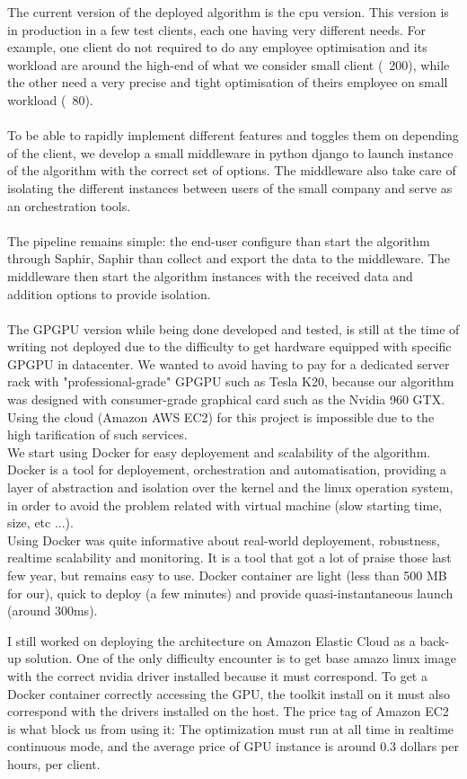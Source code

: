 \documentclass[12pt]{memoir}
\begin{document}
The current version of the deployed algorithm is the cpu version. This version is in
production in a few test clients, each one having very different needs. For example,
one client do not required to do any employee optimisation and its workload are
around the high-end of what we consider small client (~200), while the other need a
very precise and tight optimisation of theirs employee on small workload (~80).\\
\\
To be able to rapidly implement different features and toggles them on depending of the client,
we develop a small middleware in python django to launch instance of the algorithm
with the correct set of options. The middleware also take care of isolating the
different instances between users of the small company and serve as an orchestration
tools.\\
\\
The pipeline remains simple: the end-user configure than start the algorithm through
Saphir, Saphir than collect and export the data to the middleware. The middleware
then start the algorithm instances with the received data and addition options to
provide isolation.\\
\\
The GPGPU version while being done developed and tested, is still at the time of
writing not deployed due to the difficulty to get hardware equipped with specific
GPGPU in datacenter. We wanted to avoid having to pay for a dedicated server rack
with "professional-grade" GPGPU such as Tesla K20, because our algorithm was
designed with consumer-grade graphical card such as the Nvidia 960 GTX. Using the
cloud (Amazon AWS EC2) for this project is impossible due to the high tarification
of such services.
\\
We start using Docker for easy deployement and scalability of the algorithm. Docker
is a tool for deployement, orchestration and automatisation, providing a layer of
abstraction and isolation over the kernel and the linux operation system, in order
to avoid the problem related with virtual machine (slow starting time, size, etc
...). \\
Using Docker was quite informative about real-world deployement, robustness,
realtime scalability and monitoring. It is a tool that got a lot of praise those
last few year, but remains easy to use. Docker container are light (less than 500
MB for our), quick to deploy (a few minutes) and provide quasi-instantaneous launch
(around 300ms).

I still worked on deploying the architecture on Amazon Elastic Cloud as a back-up
solution. One of the only difficulty encounter is to get base amazo linux image with the
correct nvidia driver installed because it must correspond. To get a Docker
container correctly accessing the GPU, the toolkit install on it must also
correspond with the drivers installed on the host.
The price tag of Amazon EC2 is what block us from using it: The optimization must
run at all time in realtime continuous mode, and the average price of GPU instance
is around 0.3 dollars per hours, per client. 
\end{document}

